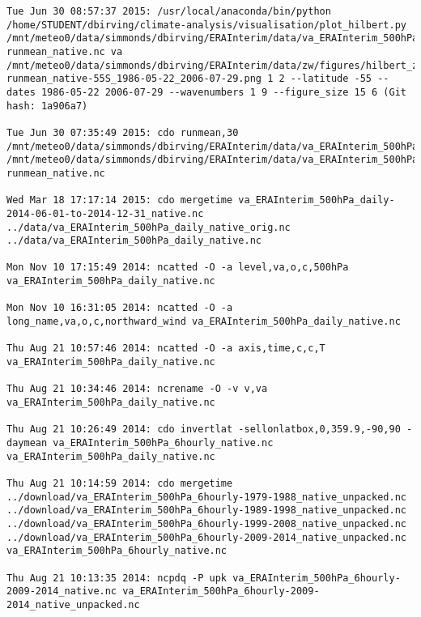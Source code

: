  
 \begin{featurebox}

\begin{tcolorbox}[width=\textwidth]

\begin{lstlisting}[basicstyle=\footnotesize\ttfamily, breaklines=true]
Tue Jun 30 08:57:37 2015: /usr/local/anaconda/bin/python /home/STUDENT/dbirving/climate-analysis/visualisation/plot_hilbert.py /mnt/meteo0/data/simmonds/dbirving/ERAInterim/data/va_ERAInterim_500hPa_030day-runmean_native.nc va /mnt/meteo0/data/simmonds/dbirving/ERAInterim/data/zw/figures/hilbert_zw_w19_va_ERAInterim_500hPa_030day-runmean_native-55S_1986-05-22_2006-07-29.png 1 2 --latitude -55 --dates 1986-05-22 2006-07-29 --wavenumbers 1 9 --figure_size 15 6 (Git hash: 1a906a7)

Tue Jun 30 07:35:49 2015: cdo runmean,30 /mnt/meteo0/data/simmonds/dbirving/ERAInterim/data/va_ERAInterim_500hPa_daily_native.nc /mnt/meteo0/data/simmonds/dbirving/ERAInterim/data/va_ERAInterim_500hPa_030day-runmean_native.nc

Wed Mar 18 17:17:14 2015: cdo mergetime va_ERAInterim_500hPa_daily-2014-06-01-to-2014-12-31_native.nc ../data/va_ERAInterim_500hPa_daily_native_orig.nc ../data/va_ERAInterim_500hPa_daily_native.nc

Mon Nov 10 17:15:49 2014: ncatted -O -a level,va,o,c,500hPa va_ERAInterim_500hPa_daily_native.nc

Mon Nov 10 16:31:05 2014: ncatted -O -a long_name,va,o,c,northward_wind va_ERAInterim_500hPa_daily_native.nc

Thu Aug 21 10:57:46 2014: ncatted -O -a axis,time,c,c,T va_ERAInterim_500hPa_daily_native.nc

Thu Aug 21 10:34:46 2014: ncrename -O -v v,va va_ERAInterim_500hPa_daily_native.nc

Thu Aug 21 10:26:49 2014: cdo invertlat -sellonlatbox,0,359.9,-90,90 -daymean va_ERAInterim_500hPa_6hourly_native.nc va_ERAInterim_500hPa_daily_native.nc

Thu Aug 21 10:14:59 2014: cdo mergetime ../download/va_ERAInterim_500hPa_6hourly-1979-1988_native_unpacked.nc ../download/va_ERAInterim_500hPa_6hourly-1989-1998_native_unpacked.nc ../download/va_ERAInterim_500hPa_6hourly-1999-2008_native_unpacked.nc ../download/va_ERAInterim_500hPa_6hourly-2009-2014_native_unpacked.nc va_ERAInterim_500hPa_6hourly_native.nc

Thu Aug 21 10:13:35 2014: ncpdq -P upk va_ERAInterim_500hPa_6hourly-2009-2014_native.nc va_ERAInterim_500hPa_6hourly-2009-2014_native_unpacked.nc


\end{lstlisting}
\end{tcolorbox}
\end{featurebox}
